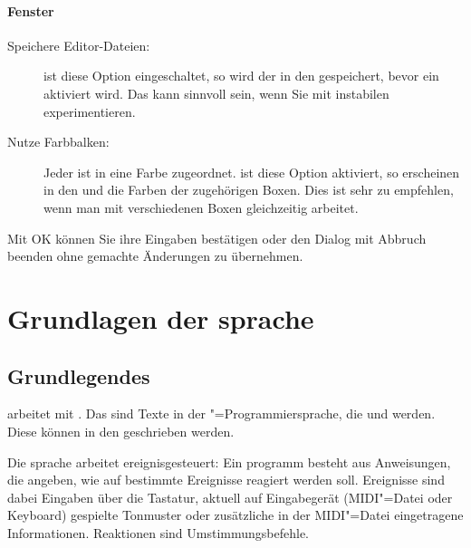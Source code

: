 \subsection{Fenster}
\begin{description}
\item[Speichere Editor-Dateien:] ist diese Option
  eingeschaltet, so wird der  in
  den  gespeichert, bevor ein
   aktiviert wird.  Das
  kann sinnvoll sein, wenn Sie mit instabilen
   experimentieren.
\item[Nutze Farbbalken:] Jeder
   ist in \mutabor{} eine Farbe zugeordnet.
  ist diese Option aktiviert, so erscheinen in den
   und
   die Farben der
  zugehörigen Boxen. Dies ist sehr zu empfehlen, wenn man mit
  verschiedenen Boxen gleichzeitig arbeitet.
\end{description}

Mit OK können Sie ihre Eingaben bestätigen oder den Dialog 
mit Abbruch beenden ohne gemachte Änderungen zu übernehmen.




\part{Grundlagen der \mutabor sprache}
\label{sec:SX_BASICS}

\chapter{Grundlegendes}

\mutabor{} arbeitet mit
. Das sind Texte in der
\mutabor{}"=Programmiersprache, die
 und
 werden. Diese
 können in den
 geschrieben werden.

Die \mutabor{}sprache arbeitet ereignisgesteuert: Ein
\mutabor{}programm besteht aus Anweisungen, die angeben, wie auf
bestimmte Ereignisse reagiert werden soll. Ereignisse sind dabei
Eingaben über die Tastatur, aktuell auf Eingabegerät (MIDI"=Datei oder
Keyboard) gespielte Tonmuster oder zusätzliche in der MIDI"=Datei
eingetragene Informationen. Reaktionen sind Umstimmungsbefehle.


